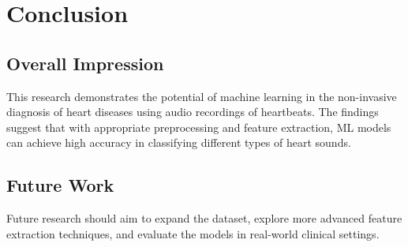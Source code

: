 \documentclass[twocolumn]{class}
\begin{document}
\section{Conclusion}
\subsection{Overall Impression}
This research demonstrates the potential of machine learning in the non-invasive diagnosis of heart diseases using audio recordings of heartbeats. The findings suggest that with appropriate preprocessing and feature extraction, ML models can achieve high accuracy in classifying different types of heart sounds.

\subsection{Future Work}
Future research should aim to expand the dataset, explore more advanced feature extraction techniques, and evaluate the models in real-world clinical settings.


\clearpage


\clearpage
\printbibliography
\end{document}

